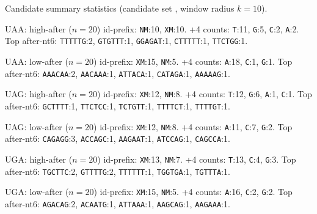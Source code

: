 Candidate summary statistics (candidate set , window radius $k=10$).

UAA: high-after ($n=20$) id-prefix: \texttt{NM}:10, \texttt{XM}:10. +4 counts: \texttt{T}:11, \texttt{G}:5, \texttt{C}:2, \texttt{A}:2. Top after-nt6: \texttt{TTTTTG}:2, \texttt{GTGTTT}:1, \texttt{GGAGAT}:1, \texttt{CTTTTT}:1, \texttt{TTCTGG}:1.

UAA: low-after ($n=20$) id-prefix: \texttt{XM}:15, \texttt{NM}:5. +4 counts: \texttt{A}:18, \texttt{C}:1, \texttt{G}:1. Top after-nt6: \texttt{AAACAA}:2, \texttt{AACAAA}:1, \texttt{ATTACA}:1, \texttt{CATAGA}:1, \texttt{AAAAAG}:1.

UAG: high-after ($n=20$) id-prefix: \texttt{XM}:12, \texttt{NM}:8. +4 counts: \texttt{T}:12, \texttt{G}:6, \texttt{A}:1, \texttt{C}:1. Top after-nt6: \texttt{GCTTTT}:1, \texttt{TTCTCC}:1, \texttt{TCTGTT}:1, \texttt{TTTTCT}:1, \texttt{TTTTGT}:1.

UAG: low-after ($n=20$) id-prefix: \texttt{XM}:12, \texttt{NM}:8. +4 counts: \texttt{A}:11, \texttt{C}:7, \texttt{G}:2. Top after-nt6: \texttt{CAGAGG}:3, \texttt{ACCAGC}:1, \texttt{AAGAAT}:1, \texttt{ATCCAG}:1, \texttt{CAGCCA}:1.

UGA: high-after ($n=20$) id-prefix: \texttt{XM}:13, \texttt{NM}:7. +4 counts: \texttt{T}:13, \texttt{C}:4, \texttt{G}:3. Top after-nt6: \texttt{TGCTTC}:2, \texttt{GTTTTG}:2, \texttt{TTTTTT}:1, \texttt{TGGTGA}:1, \texttt{TGTTTA}:1.

UGA: low-after ($n=20$) id-prefix: \texttt{XM}:15, \texttt{NM}:5. +4 counts: \texttt{A}:16, \texttt{C}:2, \texttt{G}:2. Top after-nt6: \texttt{AGACAG}:2, \texttt{ACAATG}:1, \texttt{ATTAAA}:1, \texttt{AAGCAG}:1, \texttt{AAGAAA}:1.
